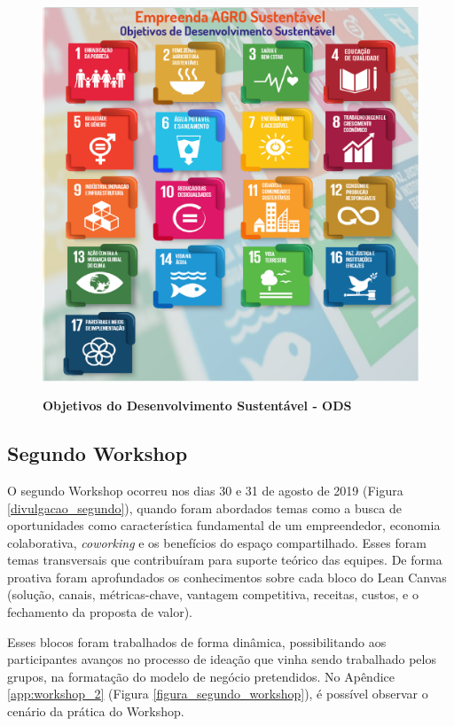 \begin{figure}[H]
\centering
\caption{\textbf{Objetivos do Desenvolvimento Sustentável - ODS}}
\includegraphics[scale=0.2]{Imagens/ODS_GERAL.png}
\label{ods}
\end{figure}


\subsection{Segundo Workshop}


O segundo Workshop ocorreu nos dias 30 e 31 de agosto de 2019 (Figura \ref{divulgacao_segundo}), quando foram abordados temas como a busca de oportunidades como característica fundamental de um empreendedor, economia colaborativa, \textit{coworking} e os benefícios do espaço compartilhado. Esses foram temas transversais que contribuíram para suporte teórico das equipes. De forma proativa foram aprofundados os conhecimentos sobre cada bloco do Lean Canvas (solução, canais, métricas-chave, vantagem competitiva, receitas, custos, e o fechamento da proposta de valor). 

Esses blocos foram trabalhados de forma dinâmica, possibilitando aos participantes avanços no processo de ideação que vinha sendo trabalhado pelos grupos, na formatação do modelo de negócio pretendidos. No Apêndice \ref{app:workshop_2} (Figura \ref{figura_segundo_workshop}), 
é possível observar o cenário da prática do Workshop.
 

